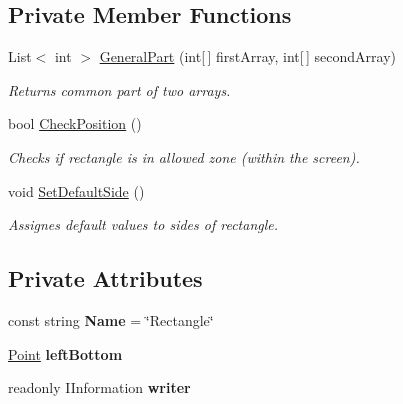 \subsection*{Private Member Functions}
\begin{DoxyCompactItemize}
\item 
List$<$ int $>$ \mbox{\hyperlink{class_home_work_1_1_task_library_1_1_tasks_1_1_lesson6_1_1_task1_1_1_classes_1_1_rectangle_a4ea5ddc959ec5ab2af1eedea67a3b961}{General\+Part}} (int\mbox{[}$\,$\mbox{]} first\+Array, int\mbox{[}$\,$\mbox{]} second\+Array)
\begin{DoxyCompactList}\small\item\em Returns common part of two arrays. \end{DoxyCompactList}\item 
bool \mbox{\hyperlink{class_home_work_1_1_task_library_1_1_tasks_1_1_lesson6_1_1_task1_1_1_classes_1_1_rectangle_af46aa60b0bb4d368679566d4ccce881f}{Check\+Position}} ()
\begin{DoxyCompactList}\small\item\em Checks if rectangle is in allowed zone (within the screen). \end{DoxyCompactList}\item 
void \mbox{\hyperlink{class_home_work_1_1_task_library_1_1_tasks_1_1_lesson6_1_1_task1_1_1_classes_1_1_rectangle_a28c407ba36ffa8d869a461a315235cb1}{Set\+Default\+Side}} ()
\begin{DoxyCompactList}\small\item\em Assignes default values to sides of rectangle. \end{DoxyCompactList}\end{DoxyCompactItemize}
\subsection*{Private Attributes}
\begin{DoxyCompactItemize}
\item 
\mbox{\label{class_home_work_1_1_task_library_1_1_tasks_1_1_lesson6_1_1_task1_1_1_classes_1_1_rectangle_ae4b071e63ce5e91e8df3acbd548c9cd2}} 
const string {\bfseries Name} = \char`\"{}Rectangle\char`\"{}
\item 
\mbox{\label{class_home_work_1_1_task_library_1_1_tasks_1_1_lesson6_1_1_task1_1_1_classes_1_1_rectangle_afb0bdb6a9db3d1674c37c6dab10e0805}} 
\mbox{\hyperlink{struct_home_work_1_1_task_library_1_1_tasks_1_1_lesson6_1_1_task1_1_1_classes_1_1_point}{Point}} {\bfseries left\+Bottom}
\item 
\mbox{\label{class_home_work_1_1_task_library_1_1_tasks_1_1_lesson6_1_1_task1_1_1_classes_1_1_rectangle_af101032bb2680463b9f69383cc352ae0}} 
readonly I\+Information {\bfseries writer}
\end{DoxyCompactItemize}


